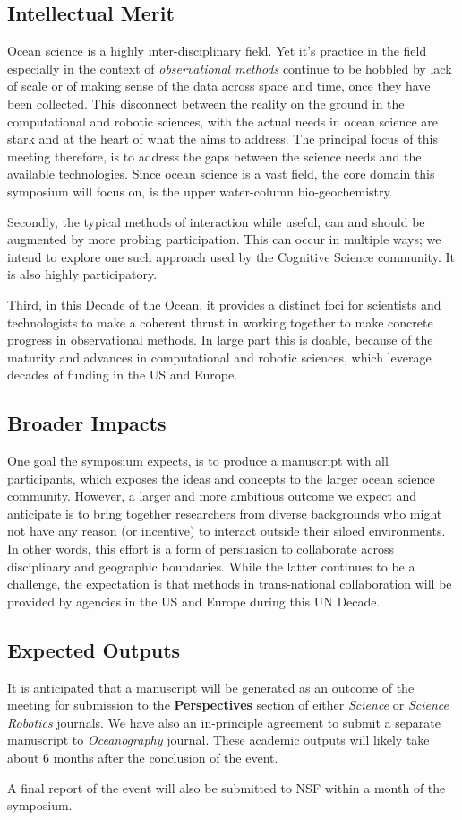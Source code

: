 \subsection{Intellectual Merit}

Ocean science is a highly inter-disciplinary field. Yet it's practice in
the field especially in the context of \emph{observational methods}
continue to be hobbled by lack of scale or of making sense of the data
across space and time, once they have been collected. This disconnect
between the reality on the ground in the computational and robotic
sciences, with the actual needs in ocean science are stark and at the
heart of what the \symp aims to address. The principal focus of this
meeting therefore, is to address the gaps between the science needs and
the available technologies. Since ocean science is a vast field, the
core domain this symposium will focus on, is the upper water-column
bio-geochemistry.

Secondly, the typical methods of interaction while useful, can and
should be augmented by more probing participation. This can occur in
multiple ways; we intend to explore one such approach used by the
Cognitive Science community. It is also highly participatory.

Third, in this Decade of the Ocean, it provides a distinct foci for
scientists and technologists to make a coherent thrust in working
together to make concrete progress in observational methods. In large
part this is doable, because of the maturity and advances in
computational and robotic sciences, which leverage decades of funding in
the US and Europe.

\subsection{Broader Impacts}

One goal the symposium expects, is to produce a manuscript with all
participants, which exposes the ideas and concepts to the larger ocean
science community. However, a larger and more ambitious outcome we
expect and anticipate is to bring together researchers from diverse
backgrounds who might not have any reason (or incentive) to interact
outside their siloed environments. In other words, this effort is a form
of persuasion to collaborate across disciplinary and geographic
boundaries. While the latter continues to be a challenge, the
expectation is that methods in trans-national collaboration will be
provided by agencies in the US and Europe during this UN Decade.

\subsection{Expected Outputs}

It is anticipated that a manuscript will be generated as an outcome of
the meeting for submission to the \textbf{Perspectives} section of
either \emph{Science} or \emph{Science Robotics} journals. We have
also an in-principle agreement to submit a separate manuscript to
\emph{Oceanography} journal. These academic outputs will likely take
about 6 months after the conclusion of the event. 

A final report of the event will also be submitted to NSF within a
month of the symposium. 
